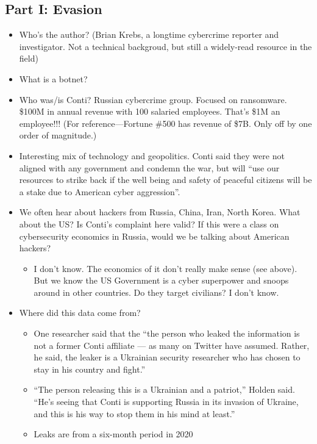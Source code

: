 \documentclass[11pt]{article}
\begin{document}
\subsection{Part I: Evasion} 

\begin{itemize}
    \item Who's the author? (Brian Krebs, a longtime cybercrime reporter and investigator. Not a technical backgroud, but still a widely-read resource in the field)
    \item What is a botnet?
    \item Who was/is Conti? Russian cybercrime group. Focused on ransomware. \$100M in annual revenue with 100 salaried employees. That's \$1M an employee!!! (For reference---Fortune \#500 has revenue of \$7B. Only off by one order of magnitude.)
    \item Interesting mix of technology and geopolitics. Conti said they were not aligned with any government and condemn the war, but will ``use our resources to strike back if the well being and safety of peaceful citizens will be a stake due to American cyber aggression''.
    \item We often hear about hackers from Russia, China, Iran, North Korea. What about the US? Is Conti's complaint here valid? If this were a class on cybersecurity economics in Russia, would we be talking about American hackers?
    \begin{itemize}
        \item I don't know. The economics of it don't really make sense (see above). But we know the US Government is a cyber superpower and snoops around in other countries. Do they target civilians? I don't know.
    \end{itemize}
    \item Where did this data come from?
    \begin{itemize}
        \item One researcher said that the ``the person who leaked the information is not a former Conti affiliate — as many on Twitter have assumed. Rather, he said, the leaker is a Ukrainian security researcher who has chosen to stay in his country and fight.''
        \item ``The person releasing this is a Ukrainian and a patriot,” Holden said. “He’s seeing that Conti is supporting Russia in its invasion of Ukraine, and this is his way to stop them in his mind at least.''
        \item Leaks are from a six-month period in 2020

\end{itemize}
\end{itemize}
\end{document}

